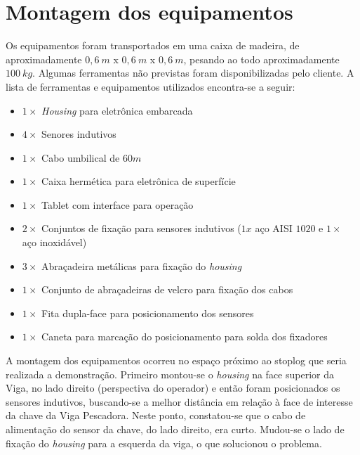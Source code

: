 \section{Montagem dos equipamentos}

Os equipamentos foram transportados em uma caixa de madeira, de aproximadamente
$0,6~m$ x $0,6~m$ x $0,6~m$, pesando ao todo aproximadamente $100~kg$. Algumas
ferramentas não previstas foram disponibilizadas pelo cliente. A lista de
ferramentas e equipamentos utilizados encontra-se a seguir:

\begin{itemize}
  \item $1\times$ \textit{Housing} para eletrônica embarcada
  \item $4\times$ Senores indutivos
  \item $1\times$ Cabo umbilical de $60m$
  \item $1\times$ Caixa hermética para eletrônica de superfície
  \item $1\times$ Tablet com interface para operação
  \item $2\times$ Conjuntos de fixação para sensores indutivos ($1x$ aço AISI
  $1020$ e $1\times$ aço inoxidável)
  \item $3\times$ Abraçadeira metálicas para fixação do \textit{housing}
  \item $1\times$ Conjunto de abraçadeiras de velcro para fixação dos cabos
  \item $1\times$ Fita dupla-face para posicionamento dos sensores
  \item $1\times$ Caneta para marcação do posicionamento para solda dos
  fixadores
 \end{itemize}
 
 A montagem dos equipamentos ocorreu no espaço próximo ao stoplog que seria
 realizada a demonstração. Primeiro montou-se o \textit{housing} na face
 superior da Viga, no lado direito (perspectiva do operador) e então foram
 posicionados os sensores indutivos, buscando-se a melhor distância em relação à
 face de interesse da chave da Viga Pescadora. Neste ponto, constatou-se que o
 cabo de alimentação do sensor da chave, do lado direito, era curto. Mudou-se o
 lado de fixação do \textit{housing} para a esquerda da viga, o que solucionou o problema.
 
